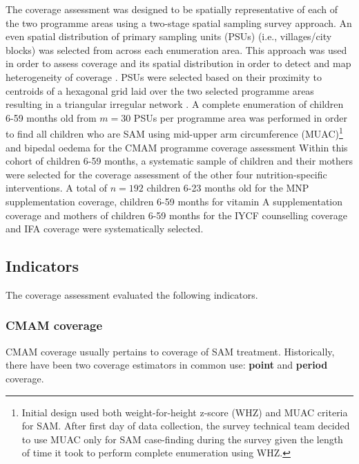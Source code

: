 \documentclass[12pt,a4paper]{article}
\let\rmarkdownfootnote\footnote%
\def\footnote{\protect\rmarkdownfootnote}
\theoremstyle{definition}
\theoremstyle{definition}
\theoremstyle{definition}
\theoremstyle{remark}
\begin{document}
The coverage assessment was designed to be spatially representative of
each of the two programme areas using a two-stage spatial sampling
survey approach. An even spatial distribution of primary sampling units
(PSUs) (i.e., villages/city blocks) was selected from across each
enumeration area. This approach was used in order to assess coverage and
its spatial distribution in order to detect and map heterogeneity of
coverage \citep[\citet{Diggle:2014tk}]{Elliott:2004cg}. PSUs were
selected based on their proximity to centroids of a hexagonal grid laid
over the two selected programme areas resulting in a triangular
irregular network \citep[\citet{Elliot:2000vs}]{Isaaks:1989uk}. A
complete enumeration of children 6-59 months old from \(m = 30\) PSUs
per programme area was performed in order to find all children who are
SAM using mid-upper arm circumference (MUAC)\footnote{Initial design
  used both weight-for-height z-score (WHZ) and MUAC criteria for SAM.
  After first day of data collection, the survey technical team decided
  to use MUAC only for SAM case-finding during the survey given the
  length of time it took to perform complete enumeration using WHZ.} and
bipedal oedema for the CMAM programme coverage assessment Within this
cohort of children 6-59 months, a systematic sample of children and
their mothers were selected for the coverage assessment of the other
four nutrition-specific interventions. A total of \(n = 192\) children
6-23 months old for the MNP supplementation coverage, children 6-59
months for vitamin A supplementation coverage and mothers of children
6-59 months for the IYCF counselling coverage and IFA coverage were
systematically selected.

\hypertarget{indicators}{%
\subsection{Indicators}\label{indicators}}

The coverage assessment evaluated the following indicators.

\hypertarget{cmam-coverage}{%
\subsubsection{CMAM coverage}\label{cmam-coverage}}

CMAM coverage usually pertains to coverage of SAM treatment.
Historically, there have been two coverage estimators in common use:
\textbf{point} and \textbf{period} coverage.
\end{document}
